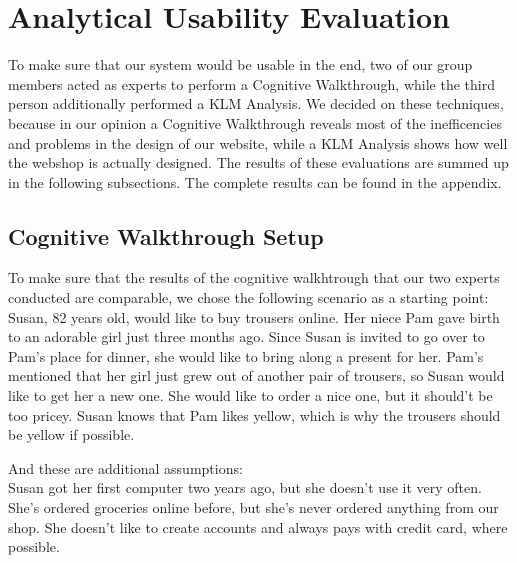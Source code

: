 \section{Analytical Usability Evaluation}
To make sure that our system would be usable in the end, two of our group members acted as experts to perform a Cognitive Walkthrough, while the third person additionally performed a KLM Analysis. We decided on these techniques, because in our opinion a Cognitive Walkthrough reveals most of the inefficencies and problems in the design of our website, while a KLM Analysis shows how well the webshop is actually designed.
The results of these evaluations are summed up in the following subsections. The complete results can be found in the appendix.

\subsection{Cognitive Walkthrough Setup}
To make sure that the results of the cognitive walkhtrough that our two experts conducted are comparable, we chose the following scenario as a starting point:\\

Susan, 82 years old, would like to buy trousers online. Her niece Pam gave birth to an adorable girl just three months ago. Since Susan is invited to go over to Pam's place for dinner, she would like to bring along a present for her. Pam's mentioned that her girl just grew out of another pair of trousers, so Susan would like to get her a new one. She would like to order a nice one, but it should't be too pricey. Susan knows that Pam likes yellow, which is why the trousers should be yellow if possible.

And these are additional assumptions:\\
Susan got her first computer two years ago, but she doesn't use it very often. She's ordered groceries online before, but she's never ordered anything from our shop. She doesn't like to create accounts and always pays with credit card, where possible.

